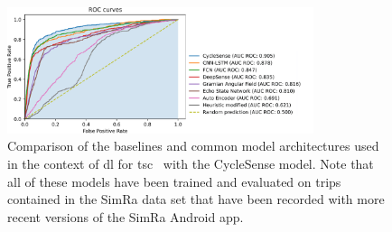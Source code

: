 \begin{figure}%
	\centering
	\includegraphics[width=0.8\textwidth]{fig/roc_auc_results_legend.png}
	\caption{Comparison of the baselines and common model architectures used in the context of \ac{dl} for \ac{tsc}~\cite{ismail2019deep} with the CycleSense model. Note that all of these models have been trained and evaluated on trips contained in the SimRa data set that have been recorded with more recent versions of the SimRa Android app.}
	\label{fig:roc-auc-results}
\end{figure}

\begin{table}
	\centering
\caption{Comparison of the baselines and common model architectures used in the context of \ac{dl} for \ac{tsc}~\cite{ismail2019deep} with the CycleSense model. See the discussion in Section~\ref{subsec:metrics} about the usefulness of various metrics. Note also that all of these models have been trained and evaluated on trips contained in the SimRa data set that have been recorded with more recent versions of the SimRa Android app. For all models the threshold which optimizes Youden's index\cite{youden1950index} were chosen.}
\label{tab:roc-auc-results}
\end{table}

